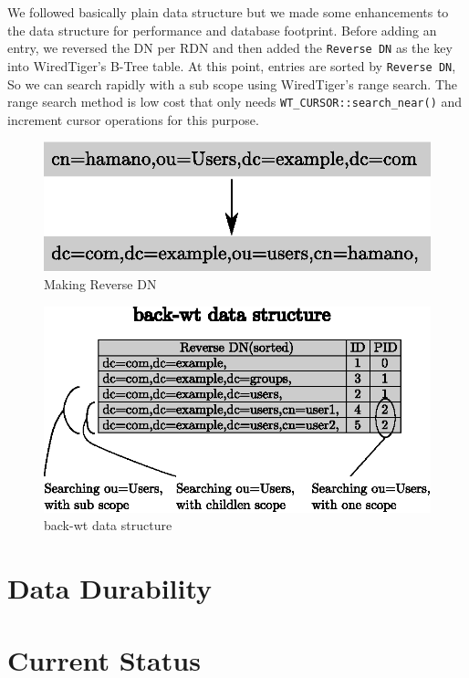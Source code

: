 \documentclass[a4paper,twocolumn,11pt]{article}
\begin{document}
We followed basically plain data structure but we made some enhancements
to the data structure for performance and database footprint. Before
adding an entry, we reversed the DN per RDN and then added the
\texttt{Reverse\ DN} as the key into WiredTiger's B-Tree table. At this
point, entries are sorted by \texttt{Reverse\ DN}, So we can search
rapidly with a sub scope using WiredTiger's range search. The range
search method is low cost that only needs
\texttt{WT\_CURSOR::search\_near()} and increment cursor operations for
this purpose.

\begin{figure}[H]
\centering
\includegraphics[width=0.9\columnwidth]{figure/reverse_dn.eps}
\caption{Making Reverse DN}
\end{figure}

\begin{figure}[H]
\centering
\includegraphics[width=0.9\columnwidth]{figure/back-wt_data_structure.eps}
\caption{back-wt data structure}
\end{figure}

\section{Data Durability}\label{data-durability}

\section{Current Status}\label{current-status}
\end{document}
